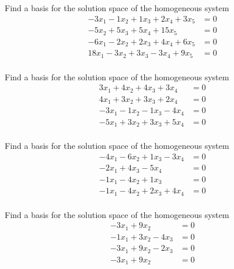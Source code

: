 \documentclass{article}
\begin{document}
\begin{exerciseStatement}
    Find a basis for the solution space of the homogeneous system
\begin{align*}
 -3 x_ 1 -1 x_ 2 + 1 x_ 3 + 2 x_ 4 + 3 x_ 5 &= 0  \\
  -5 x_ 2 + 5 x_ 3 + 5 x_ 4 + 15 x_ 5 &= 0  \\
  -6 x_ 1 -2 x_ 2 + 2 x_ 3 + 4 x_ 4 + 6 x_ 5 &= 0  \\
  18 x_ 1 -3 x_ 2 + 3 x_ 3 -3 x_ 4 + 9 x_ 5 &= 0  \\
 \end{align*}



  
\end{exerciseStatement}

\begin{exerciseStatement}
    Find a basis for the solution space of the homogeneous system
\begin{align*}
 3 x_ 1 + 4 x_ 2 + 4 x_ 3 + 3 x_ 4 &= 0  \\
  4 x_ 1 + 3 x_ 2 + 3 x_ 3 + 2 x_ 4 &= 0  \\
  -3 x_ 1 -1 x_ 2 -1 x_ 3 -4 x_ 4 &= 0  \\
  -5 x_ 1 + 3 x_ 2 + 3 x_ 3 + 5 x_ 4 &= 0  \\
 \end{align*}



  
\end{exerciseStatement}

\begin{exerciseStatement}
    Find a basis for the solution space of the homogeneous system
\begin{align*}
 -4 x_ 1 -6 x_ 2 + 1 x_ 3 -3 x_ 4 &= 0  \\
  -2 x_ 1 + 4 x_ 3 -5 x_ 4 &= 0  \\
  -1 x_ 1 -4 x_ 2 + 1 x_ 3 &= 0  \\
  -1 x_ 1 -4 x_ 2 + 2 x_ 3 + 4 x_ 4 &= 0  \\
 \end{align*}



  
\end{exerciseStatement}

\begin{exerciseStatement}
    Find a basis for the solution space of the homogeneous system
\begin{align*}
 -3 x_ 1 + 9 x_ 2 &= 0  \\
  -1 x_ 1 + 3 x_ 2 -4 x_ 3 &= 0  \\
  -3 x_ 1 + 9 x_ 2 -2 x_ 3 &= 0  \\
  -3 x_ 1 + 9 x_ 2 &= 0  \\
 \end{align*}



  
\end{exerciseStatement}
\end{document}
